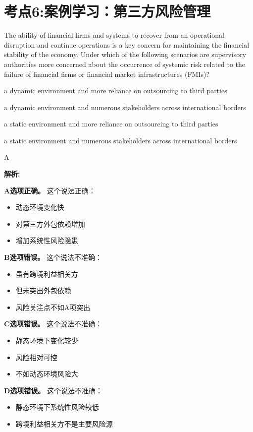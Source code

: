 \documentclass{article}
\newcounter{question} %
\newenvironment{explanation}
{\textbf{解析:}\par}
{\par}
\begin{document}
\newpage


\section{考点6:案例学习：第三方风险管理}
\setcounter{question}{0}
\begin{question}
    The ability of financial firms and systems to recover from an operational disruption and continue operations is a key concern for maintaining the financial stability of the economy. Under which of the following scenarios are supervisory authorities more concerned about the occurrence of systemic risk related to the failure of financial firms or financial market infrastructures (FMIs)?
\end{question}

\begin{choices}
    \item a dynamic environment and more reliance on outsourcing to third parties
    \item a dynamic environment and numerous stakeholders across international borders
    \item a static environment and more reliance on outsourcing to third parties
    \item a static environment and numerous stakeholders across international borders
\end{choices}

\begin{correctanswer}
    A
\end{correctanswer}

\begin{explanation}
    \textbf{A选项正确。}
    这个说法正确：
    \begin{itemize}
        \item 动态环境变化快
        \item 对第三方外包依赖增加
        \item 增加系统性风险隐患
    \end{itemize}

    \textbf{B选项错误。}
    这个说法不准确：
    \begin{itemize}
        \item 虽有跨境利益相关方
        \item 但未突出外包依赖
        \item 风险关注点不如A项突出
    \end{itemize}

    \textbf{C选项错误。}
    这个说法不准确：
    \begin{itemize}
        \item 静态环境下变化较少
        \item 风险相对可控
        \item 不如动态环境风险大
    \end{itemize}

    \textbf{D选项错误。}
    这个说法不准确：
    \begin{itemize}
        \item 静态环境下系统性风险较低
        \item 跨境利益相关方不是主要风险源
    \end{itemize}
\end{explanation}
\end{document}
